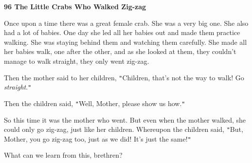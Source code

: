 
\textbf{96 The Little Crabs Who Walked Zig-zag}

Once upon a time there was a great female crab. She was a very big one. She also
had a lot of babies. One day she led all her babies out and made them practice
walking. She was staying behind them and watching them carefully. She made all
her babies walk, one after the other, and as she looked at them, they couldn't
manage to walk straight, they only went zig-zag.

Then the mother said to her children, \texttt{"}Children, that's not the way to
walk! Go \textit{straight}.\texttt{"}

Then the children said, \texttt{"}Well, Mother, please show us how.\texttt{"}

So this time it was the mother who went. But even when the mother walked, she could
only go zig-zag, just like her children. Whereupon the children said, \texttt{"}But,
Mother, you go zig-zag too, just as we did! It's just the same!\texttt{"}

What can we learn from this, brethren?


